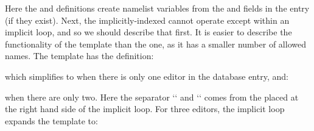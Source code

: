 \documentclass[letterpaper,10pt,english]{sphinxmanual}
\begin{document}
Here the  and  definitions create namelist variables from the  and  fields in the entry (if they exist). Next, the implicitly-indexed  cannot operate except within an implicit loop, and so we should describe that first. It is easier to describe the functionality of the  template than the  one, as it has a smaller number of allowed names. The  template has the definition:

%
\begin{sphinxVerbatim}[commandchars=\\\{\}]
   
\end{sphinxVerbatim}

which simplifies to  when there is only one editor in the database entry, and:

%
\begin{sphinxVerbatim}[commandchars=\\\{\}]
  
\end{sphinxVerbatim}

when there are only two. Here the separator {}`{}` and {}`{}` comes from the  placed at the right hand side of the implicit loop. For three editors, the implicit loop expands the template to:

%
\begin{sphinxVerbatim}[commandchars=\\\{\}]
   
\end{sphinxVerbatim}
\end{document}
